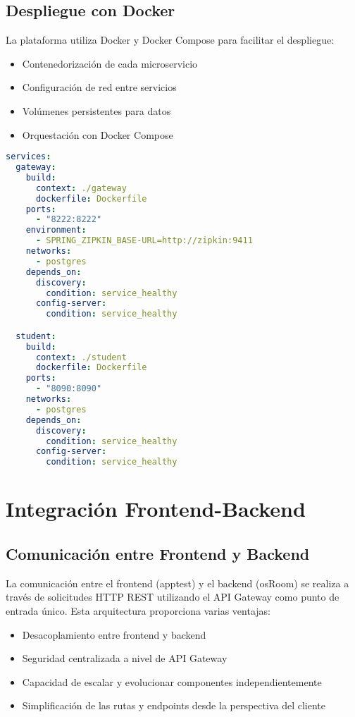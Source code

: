 \documentclass[12pt,a4paper]{report}
\begin{document}
\section{Despliegue con Docker}
La plataforma utiliza Docker y Docker Compose para facilitar el despliegue:

\begin{itemize}
    \item Contenedorización de cada microservicio
    \item Configuración de red entre servicios
    \item Volúmenes persistentes para datos
    \item Orquestación con Docker Compose
\end{itemize}

\begin{lstlisting}[language=YAML, caption=Extracto de docker-compose.yml]
services:
  gateway:
    build:
      context: ./gateway
      dockerfile: Dockerfile
    ports:
      - "8222:8222"
    environment:
      - SPRING_ZIPKIN_BASE-URL=http://zipkin:9411
    networks:
      - postgres
    depends_on:
      discovery:
        condition: service_healthy
      config-server:
        condition: service_healthy

  student:
    build:
      context: ./student
      dockerfile: Dockerfile
    ports:
      - "8090:8090"
    networks:
      - postgres
    depends_on:
      discovery:
        condition: service_healthy
      config-server:
        condition: service_healthy
\end{lstlisting}

\chapter{Integración Frontend-Backend}
\section{Comunicación entre Frontend y Backend}
La comunicación entre el frontend (apptest) y el backend (osRoom) se realiza a través de solicitudes HTTP REST utilizando el API Gateway como punto de entrada único. Esta arquitectura proporciona varias ventajas:

\begin{itemize}
    \item Desacoplamiento entre frontend y backend
    \item Seguridad centralizada a nivel de API Gateway
    \item Capacidad de escalar y evolucionar componentes independientemente
    \item Simplificación de las rutas y endpoints desde la perspectiva del cliente
\end{itemize}
\end{document}
